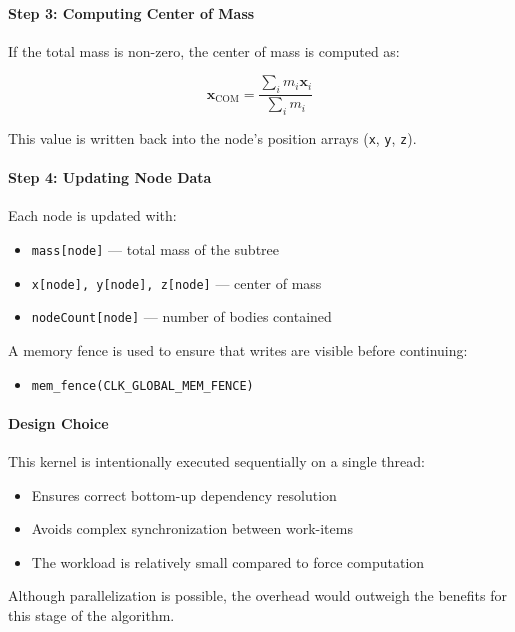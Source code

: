 \documentclass[12pt]{article}
\begin{document}
\paragraph{Step 3: Computing Center of Mass}

If the total mass is non-zero, the center of mass is computed as:

\[
\mathbf{x}_{\text{COM}} = \frac{\sum_i m_i \mathbf{x}_i}{\sum_i m_i}
\]

This value is written back into the node's position arrays
(\texttt{x}, \texttt{y}, \texttt{z}).

\paragraph{Step 4: Updating Node Data}

Each node is updated with:

\begin{itemize}
    \item \texttt{mass[node]} — total mass of the subtree
    \item \texttt{x[node], y[node], z[node]} — center of mass
    \item \texttt{nodeCount[node]} — number of bodies contained
\end{itemize}

A memory fence is used to ensure that writes are visible before continuing:

\begin{itemize}
    \item \texttt{mem\_fence(CLK\_GLOBAL\_MEM\_FENCE)}
\end{itemize}

\paragraph{Design Choice}

This kernel is intentionally executed sequentially on a single thread:

\begin{itemize}
    \item Ensures correct bottom-up dependency resolution
    \item Avoids complex synchronization between work-items
    \item The workload is relatively small compared to force computation
\end{itemize}

Although parallelization is possible, the overhead would outweigh the benefits
for this stage of the algorithm.
\end{document}
